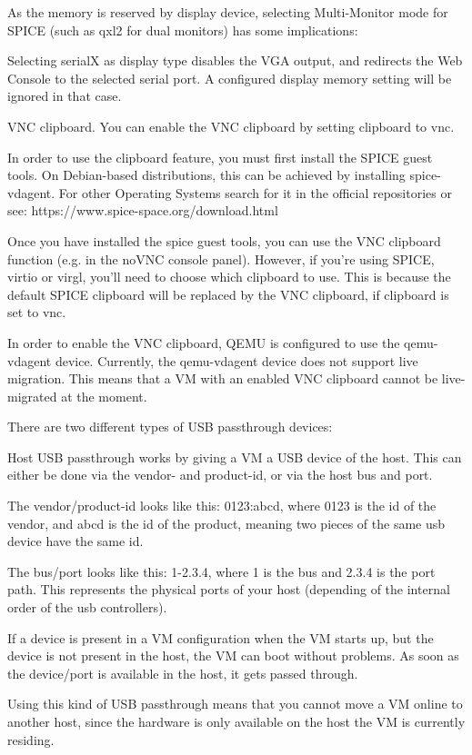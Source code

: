 As the memory is reserved by display device, selecting Multi-Monitor mode for SPICE (such as qxl2 for dual monitors) has some implications:

Selecting serialX as display type disables the VGA output, and redirects the Web Console to the selected serial port. A configured display memory setting will be ignored in that case.

VNC clipboard. You can enable the VNC clipboard by setting clipboard to vnc.

In order to use the clipboard feature, you must first install the SPICE guest tools. On Debian-based distributions, this can be achieved by installing spice-vdagent. For other Operating Systems search for it in the official repositories or see: https://www.spice-space.org/download.html

Once you have installed the spice guest tools, you can use the VNC clipboard function (e.g. in the noVNC console panel). However, if you’re using SPICE, virtio or virgl, you’ll need to choose which clipboard to use. This is because the default SPICE clipboard will be replaced by the VNC clipboard, if clipboard is set to vnc.

In order to enable the VNC clipboard, QEMU is configured to use the qemu-vdagent device. Currently, the qemu-vdagent device does not support live migration. This means that a VM with an enabled VNC clipboard cannot be live-migrated at the moment.

There are two different types of USB passthrough devices:

Host USB passthrough works by giving a VM a USB device of the host. This can either be done via the vendor- and product-id, or via the host bus and port.

The vendor/product-id looks like this: 0123:abcd, where 0123 is the id of the vendor, and abcd is the id of the product, meaning two pieces of the same usb device have the same id.

The bus/port looks like this: 1-2.3.4, where 1 is the bus and 2.3.4 is the port path. This represents the physical ports of your host (depending of the internal order of the usb controllers).

If a device is present in a VM configuration when the VM starts up, but the device is not present in the host, the VM can boot without problems. As soon as the device/port is available in the host, it gets passed through.

Using this kind of USB passthrough means that you cannot move a VM online to another host, since the hardware is only available on the host the VM is currently residing.

